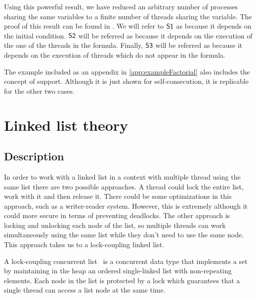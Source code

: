Using this powerful result, we have reduced an arbitrary number of processes sharing the same variables to a finite number of threads sharing the variable. 
%
The proof of this result can be found in .
%
We will refer to $\mathsf{S1}$ as  because it depends on the initial condition.
%
$\mathsf{S2}$ will be referred as  because it depends on the execution of the one of the threads in the formula.
%
Finally, $\mathsf{S3}$ will be referred as  because it depends on the execution of threads which do not appear in the formula. 


The example included as an appendix in \ref{app:exampleFactorial} also includes the concept of support. 
%
Although it is just shown for self-consecution, it is replicable for the other two cases.


\section{Linked list theory}

\subsection{Description}

In order to work with a linked list in a context with multiple thread using the same list 
there are two possible approaches. 
%
A thread could lock the entire list, work with it and then release it. 
%
There could be some optimizations in this approach, such as a writer-reader system.
%
However, this is extremely  although it could more secure in terms of preventing deadlocks.
%
The other approach is locking and unlocking each node of the list, so multiple threads can work simultaneously using the same list while they don't need to use the same node.
%
This approach takes us to a lock-coupling linked list.



\begin{defn}
A lock-coupling concurrent list~\cite{herlihy08art,vafeiadis06proving} is 
a concurrent data type that implements a set by maintaining in the heap an 
ordered single-linked list with non-repeating elements.
%
Each node in the list is protected by a lock which guarantees that a 
single thread can access a list node at the same time.
%
\end{defn}

